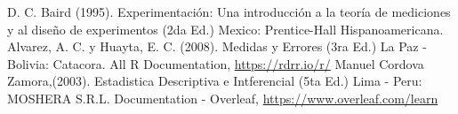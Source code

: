 \documentclass[11pt]{article}
\begin{document}
\begin{multicols}{2}
        \begin{thebibliography}{10}
             D. C. Baird (1995). Experimentación: Una introducción a la teoría de mediciones y al diseño de experimentos (2da Ed.) Mexico: Prentice-Hall Hispanoamericana.
             Alvarez, A. C. y Huayta, E. C. (2008). Medidas y Errores (3ra Ed.) La Paz - Bolivia: Catacora.
             All R Documentation, \url{https://rdrr.io/r/}
             Manuel Cordova Zamora,(2003). Estadistica Descriptiva e Intferencial (5ta Ed.) Lima - Peru: MOSHERA S.R.L.
             Documentation - Overleaf, \url{https://www.overleaf.com/learn}
        \end{thebibliography}
    \end{multicols}
\end{document}
